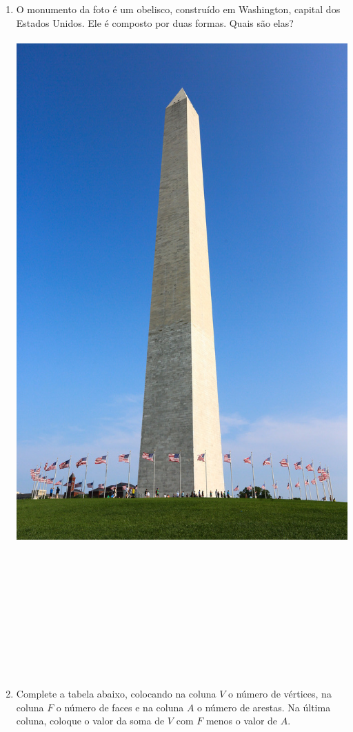 \documentclass[a4paper,14pt]{article}
\begin{document}
\begin{multicols}{2}
\begin{enumerate}
			\item O monumento da foto é um obelisco, construído em Washington, capital dos Estados Unidos. Ele é composto por duas formas. Quais são elas? \\\\
			\includegraphics[width=1\linewidth]{imagens_6FMA49/washington-monument} \\\\\\\\\\\\\\\\\\\\\\
			\item Complete a tabela abaixo, colocando na coluna $V$ o número de vértices, na coluna $F$ o número de faces e na coluna $A$ o número de arestas. Na última coluna, coloque o valor da soma de $V$ com $F$ menos o valor de $A$. \\

\end{enumerate}
\end{multicols}
\end{document}
